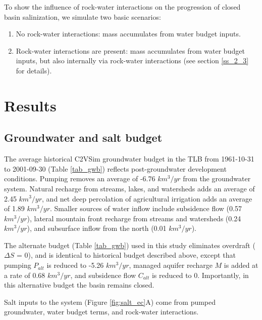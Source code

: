 To show the influence of rock-water interactions on the progression of closed basin salinization, we simulate two basic scenarios:  

\begin{enumerate}
	\item No rock-water interactions: mass accumulates from water budget inputs.  
	\item Rock-water interactions are present: mass accumulates from water budget inputs, but also internally via rock-water interactions (see section \ref{ss_2_3} for details).  
\end{enumerate} 





\section{Results}
\label{s_3}

%
%
\subsection{Groundwater and salt budget}
\label{ss_3_1}

The average historical C2VSim groundwater budget in the TLB from 1961-10-31 to 2001-09-30 (Table \ref{tab_gwb}) reflects post-groundwater development conditions. Pumping removes an average of -6.76 $km^3/yr$ from the groundwater system. Natural recharge from streams, lakes, and watersheds adds an average of 2.45 $km^3/yr$, and net deep percolation of agricultural irrigation adds an average of 1.89 $km^3/yr$. Smaller sources of water inflow include subsidence flow (0.57 $km^3/yr$), lateral mountain front recharge from streams and watersheds (0.24 $km^3/yr$), and subsurface inflow from the north (0.01 $km^3/yr$). 

The alternate budget (Table \ref{tab_gwb}) used in this study eliminates overdraft ($\Delta S$ = 0), and is identical to historical budget described above, except that pumping $P_{alt}$ is reduced to -5.26 $km^3/yr$, managed aquifer recharge $M$ is added at a rate of 0.68 $km^3/yr$, and subsidence flow $C_{alt}$ is reduced to 0. Importantly, in this alternative budget the basin remains closed.

Salt inputs to the system (Figure \ref{fig:salt_ec}A) come from pumped groundwater, water budget terms, and rock-water interactions.


